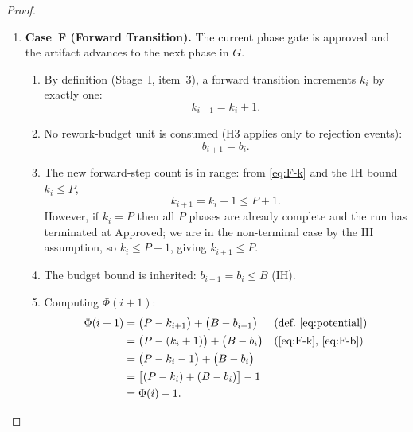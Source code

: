 \documentclass[12pt]{article}
\theoremstyle{definition}
\begin{document}
\begin{proof}
\begin{enumerate}
  \item \textbf{Case~F (Forward Transition).}
        The current phase gate is approved and the artifact advances
        to the next phase in $G$.
        \begin{enumerate}
          \item By definition (Stage~I, item~3), a forward transition
                increments $k_i$ by exactly one:
                \begin{equation}
                  \label{eq:F-k}
                  k_{i+1} = k_i + 1.
                \end{equation}
          \item No rework-budget unit is consumed (H3 applies only to
                rejection events):
                \begin{equation}
                  \label{eq:F-b}
                  b_{i+1} = b_i.
                \end{equation}
          \item The new forward-step count is in range: from
                \eqref{eq:F-k} and the IH bound $k_i \leq P$,
                \begin{equation}
                  \label{eq:F-k-bound}
                  k_{i+1} = k_i + 1 \leq P + 1.
                \end{equation}
                However, if $k_i = P$ then all $P$ phases are already
                complete and the run has terminated at
                $\mathrm{Approved}$; we are in the non-terminal case by
                the IH assumption, so $k_i \leq P - 1$, giving
                $k_{i+1} \leq P$.
          \item The budget bound is inherited: $b_{i+1} = b_i \leq B$
                (IH).
          \item Computing $\Phi(i+1)$:
                \begin{align}
                  \Phi(i+1)
                    &= \bigl(P - k_{i+1}\bigr) + \bigl(B - b_{i+1}\bigr)
                       && \text{(def.\ \eqref{eq:potential})} \notag\\
                    &= \bigl(P - (k_i+1)\bigr) + \bigl(B - b_i\bigr)
                       && \text{(\eqref{eq:F-k}, \eqref{eq:F-b})} \notag\\
                    &= \bigl(P - k_i - 1\bigr) + \bigl(B - b_i\bigr)
                       \notag\\
                    &= \bigl[(P - k_i) + (B - b_i)\bigr] - 1
                       \notag\\
                    &= \Phi(i) - 1.
                       \label{eq:F-result}
                \end{align}
        \end{enumerate}


\end{enumerate}
\end{proof}
\end{document}
